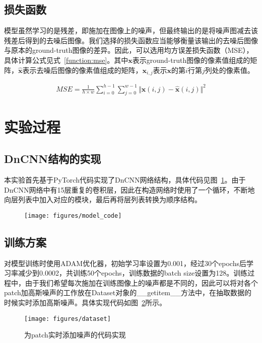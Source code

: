 \subsection{损失函数}
模型虽然学习的是残差，即施加在图像上的噪声，但最终输出的是将噪声图减去该残差后得到的去噪后图像。我们选择的损失函数应当能够衡量该输出的去噪后图像与原本的ground-truth图像的差异。因此，可以选用均方误差损失函数（MSE），具体计算公式见式~\ref{function:mse}。其中$ \boldsymbol{x} $表示ground-truth图像的像素值组成的矩阵，$ \boldsymbol{\hat{x}} $表示去噪后图像的像素值组成的矩阵，$ \boldsymbol{x}_{i, j} $表示$ \boldsymbol{x} $的第$ i $行第$ j $列处的像素值。

\begin{align} \label{function:mse}
	MSE = \frac{1}{h \times w}\sum_{i=0}^{h-1}{\sum_{j=0}^{w-1}{\Vert \boldsymbol{x}(i,j)-\boldsymbol{\hat{x}}(i,j)\Vert^2}}
\end{align}


\section{实验过程}

\subsection{DnCNN结构的实现}
本实验首先基于PyTorch代码实现了DnCNN网络结构，具体代码见图~\ref{fig:modelcode}。由于DnCNN网络中有15层重复的卷积层，因此在构造网络时使用了一个循环，不断地向层列表中加入对应的模块，最后再将层列表转换为顺序结构。

\begin{figure}
	\centering
	\texttt{[image: figures/model\_code]}
	\caption{}
	\label{fig:modelcode}
\end{figure}

\subsection{训练方案}
对模型训练时使用ADAM优化器，初始学习率设置为0.001，经过30个epochs后学习率减少到0.0002，共训练50个epochs，训练数据的batch size设置为128。训练过程中，由于我们希望每次施加在训练图像上的噪声都是不同的，因此可以将对各个patch加高斯噪声的工作放在Dataset对象的\_\_getitem\_\_方法中，在抽取数据的时候实时添加高斯噪声。具体实现代码如图~\ref{fig:dataset}所示。

\begin{figure}
	\centering
	\texttt{[image: figures/dataset]}
	\caption{为patch实时添加噪声的代码实现}
	\label{fig:dataset}
\end{figure}


